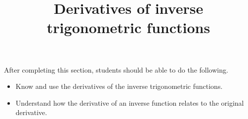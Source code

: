 \documentclass{ximera}
\title{Derivatives of inverse trigonometric functions}
\begin{document}
\begin{abstract} 
\end{abstract}

\maketitle

\begin{sectionOutcomes}
After completing this section, students should be able to do the following.

\begin{itemize}
	\item Know and use the derivatives of the inverse trigonometric functions.
	\item Understand how the derivative of an inverse function relates to the original derivative.
\end{itemize}
\end{sectionOutcomes}
\end{document}
